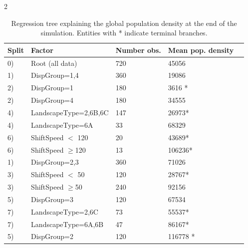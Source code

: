 \documentclass[12pt,pdftex]{article}
\begin{document}
\begin{spacing}{2}
\begin{table}
\begin{tabular}{lllll}
\hline
{\bf Split}									&{\bf Factor} 						&{\bf Number obs.} 			&{\bf Mean pop. density} 	\\ 	
\hline
\hline
\hspace{0.00cm}	0)						&Root 	(all data)				&720 							 	&45056 \\ 	
\hspace{0.4cm}   1) 						&DispGroup=1,4 				&360 							  	&19086\\ 	
 \hspace{0.8cm}    2) 						&DispGroup=1 				&180 					   			&3616 *\\		
   \hspace{0.8cm}  2) 						&DispGroup=4 				&180 							 	&34555\\	 
  \hspace{1.6cm}    4) 					&LandscapeType=2,6B,6C 	&147 							 	&26973*\\	
   \hspace{1.6cm}	4) 						&LandscapeType=6A 		&33 								&68329\\	 
     \hspace{2.4cm}   6) 					&ShiftSpeed $<$ 120 		&20 								&43689*\\	
        \hspace{2.4cm}	6) 					&ShiftSpeed $\geq$120 		&13 								&106236*\\	
\hspace{0.4cm}   1) 						&DispGroup=2,3 				&360 							  	&71026 \\	
 \hspace{1.2cm}    3) 						&ShiftSpeed $<$ 50 			&120 							  	&28767*\\	
   \hspace{1.2cm}  3) 						&ShiftSpeed $\geq$50 		&240 							  	&92156 \\	
     \hspace{2.0cm} 5) 					&DispGroup=3 				&120 							  	&67534 \\	
   \hspace{2.8cm}     7)					&LandscapeType=2,6C 		&73 								&55537*\\	
       \hspace{2.8cm} 7)					&LandscapeType=6A,6B 	&47 								&86167*\\	
     \hspace{2.0cm} 5) 					&DispGroup=2 				&120 							 	&116778 *\\	
\hline
\end{tabular}
\caption{Regression tree explaining the global population density at the end of the simulation. Entities with * indicate terminal branches. }
\end{table}



\end{spacing}
\end{document}
